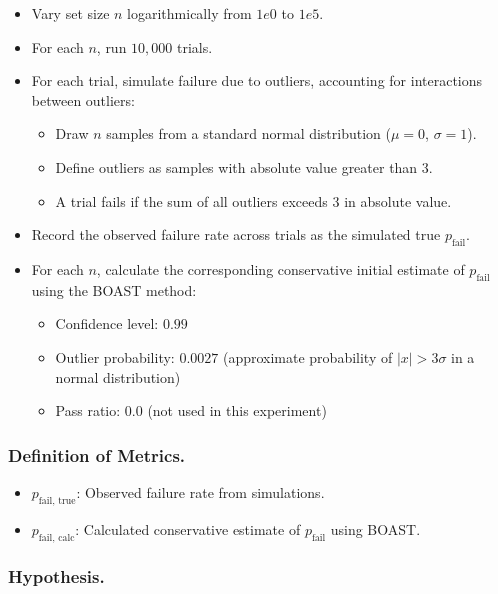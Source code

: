         \begin{itemize}
            \item Vary set size $n$ logarithmically from $1e0$ to $1e5$.
            \item For each $n$, run $10{,}000$ trials.
            \item For each trial, simulate failure due to outliers, accounting for interactions between outliers:
            \begin{itemize}
                \item Draw $n$ samples from a standard normal distribution ($\mu=0$, $\sigma=1$).  
                \item Define outliers as samples with absolute value greater than $3$.  
                \item A trial fails if the sum of all outliers exceeds $3$ in absolute value.  
            \end{itemize}
            \item Record the observed failure rate across trials as the simulated true $p_\text{fail}$.  
            \item For each $n$, calculate the corresponding conservative initial estimate of $p_\text{fail}$ using the BOAST method:
            \begin{itemize}
                \item Confidence level: $0.99$  
                \item Outlier probability: $0.0027$ (approximate probability of $|x| > 3\sigma$ in a normal distribution)  
                \item Pass ratio: $0.0$ (not used in this experiment)
            \end{itemize}
        \end{itemize}

    \subsubsection{Definition of Metrics.}

        \begin{itemize}
            \item $p_\text{fail, true}$: Observed failure rate from simulations.  
            \item $p_\text{fail, calc}$: Calculated conservative estimate of $p_\text{fail}$ using BOAST.
        \end{itemize}

    \subsubsection{Hypothesis.}

